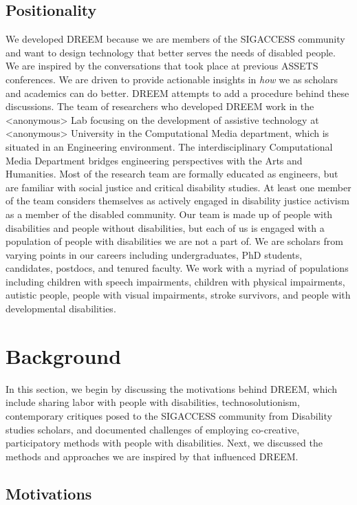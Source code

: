 \subsection{Positionality}
We developed DREEM because we are members of the SIGACCESS community and want to design technology that better serves the needs of disabled people. We are inspired by the conversations that took place at previous ASSETS conferences. We are driven to provide actionable insights in \textit{how} we as scholars and academics can do better. DREEM attempts to add a procedure behind these discussions. The team of researchers who developed DREEM work in the <anonymous> Lab focusing on the development of assistive technology at <anonymous> University in the Computational Media department, which is situated in an Engineering environment. The interdisciplinary Computational Media Department bridges engineering perspectives with the Arts and Humanities. Most of the research team are formally educated as engineers, but are familiar with social justice and critical disability studies. At least one member of the team considers themselves as actively engaged in disability justice activism as a member of the disabled community. Our team is made up of people with disabilities and people without disabilities, but each of us is engaged with a population of people with disabilities we are not a part of. We are scholars from varying points in our careers including undergraduates, PhD students, candidates, postdocs, and tenured faculty. We work with a myriad of populations including children with speech impairments, children with physical impairments, autistic people, people with visual impairments, stroke survivors, and people with developmental disabilities.

\section{Background} \label{Background}
 In this section, we begin by discussing the motivations behind DREEM, which include sharing labor with people with disabilities, technosolutionism, contemporary critiques posed to the SIGACCESS community from Disability studies scholars, and documented challenges of employing co-creative, participatory methods with people with disabilities. Next, we discussed the methods and approaches we are inspired by that influenced DREEM.

\subsection{Motivations}\label{Motivations}

